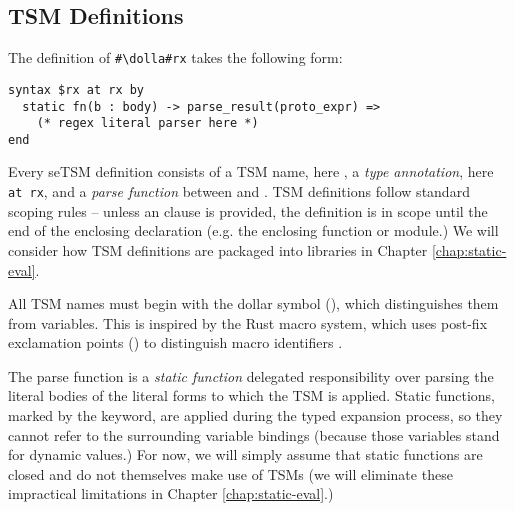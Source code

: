 \subsection{TSM Definitions}\label{sec:uetsms-definition}
The definition of \lstinline{#\dolla#rx} takes the following form:
\begin{lstlisting}[numbers=none,mathescape=|]
syntax $rx at rx by 
  static fn(b : body) -> parse_result(proto_expr) => 
    (* regex literal parser here *)
end
\end{lstlisting}
Every seTSM definition consists of a TSM name, here , a \emph{type annotation}, here \lstinline{at rx}, and a \emph{parse function} between  and . TSM definitions follow standard scoping rules -- unless an  clause is provided, the definition is in scope until the end of the enclosing declaration (e.g. the enclosing function or module.) We will consider how TSM definitions are packaged into libraries in Chapter \ref{chap:static-eval}.

All TSM names must begin with the dollar symbol (\li{#\dolla#}), which distinguishes them from variables. This is inspired by the Rust macro system, which uses post-fix exclamation points (\li{!}) to distinguish macro identifiers \cite{Rust/Macros}.

The {parse function} is a \emph{static function} delegated responsibility over parsing the literal bodies of the literal forms to which the TSM is applied. Static functions, marked by the  keyword, are applied during the typed expansion process, so they cannot refer to the surrounding variable bindings (because those variables stand for dynamic values.) For now, we will simply assume that static functions are closed and do not themselves make use of TSMs (we will eliminate these impractical limitations in Chapter \ref{chap:static-eval}.)


